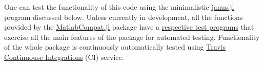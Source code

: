 One can test the functionality of this code using the minimalistic \href{https://github.com/MatlabCompat/MatlabCompat.jl/blob/dev/test/janus.m}{janus.jl} program discussed below. Unless currently in development, all the functions provided by the \href{https://github.com/MatlabCompat/MatlabCompat.jl}{MatlabCompat.jl} package have a \href{https://github.com/MatlabCompat/MatlabCompat.jl/tree/master/test}{respective test programs} that exercise all the main features of the package for automated testing. Functionality of the whole package is continuously automatically tested using \href{https://travis-ci.org/MatlabCompat/MatlabCompat.jl}{Travis Continuouse Integrations} (CI) service.
  
  
  
  
  